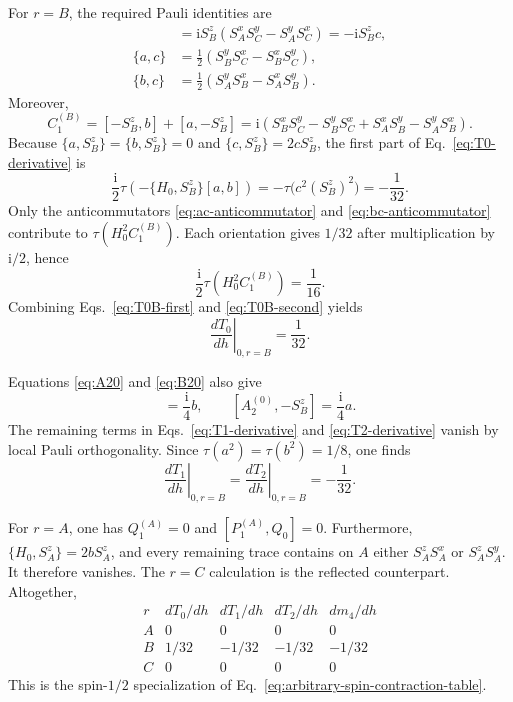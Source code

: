 \documentclass[aps,prb,preprint,nofootinbib,longbibliography]{revtex4-2}
\newcommand{\ii}{\mathrm{i}}
\begin{document}
For $r=B$, the required Pauli identities are
\begin{align}
 [a,b]
 &=\ii S_B^z(S_A^xS_C^y-S_A^yS_C^x)
 =-\ii S_B^zc,
 \label{eq:ab-commutator}\\
 \{a,c\}
 &=\frac12(S_B^yS_C^x-S_B^xS_C^y),
 \label{eq:ac-anticommutator}\\
 \{b,c\}
 &=\frac12(S_A^yS_B^x-S_A^xS_B^y).
 \label{eq:bc-anticommutator}
\end{align}
Moreover,
\begin{equation}
 C_1^{(B)}
 =[-S_B^z,b]+[a,-S_B^z]
 =\ii\left(
 S_B^xS_C^y-S_B^yS_C^x
 +S_A^xS_B^y-S_A^yS_B^x
 \right).
 \label{eq:C1B}
\end{equation}
Because $\{a,S_B^z\}=\{b,S_B^z\}=0$ and
$\{c,S_B^z\}=2cS_B^z$, the first part of
Eq.~\eqref{eq:T0-derivative} is
\begin{equation}
 \frac{\ii}{2}\tau\left(-\{H_0,S_B^z\}[a,b]\right)
 =-\tau\bigl(c^2(S_B^z)^2\bigr)
 =-\frac1{32}.
 \label{eq:T0B-first}
\end{equation}
Only the anticommutators \eqref{eq:ac-anticommutator} and
\eqref{eq:bc-anticommutator} contribute to
$\tau(H_0^2C_1^{(B)})$.  Each orientation gives $1/32$ after multiplication
by $\ii/2$, hence
\begin{equation}
 \frac{\ii}{2}\tau(H_0^2C_1^{(B)})=\frac1{16}.
 \label{eq:T0B-second}
\end{equation}
Combining Eqs.~\eqref{eq:T0B-first} and \eqref{eq:T0B-second} yields
\begin{equation}
 \left.\frac{dT_0}{dh}\right|_{0,r=B}=\frac1{32}.
 \label{eq:T0B-total}
\end{equation}

Equations \eqref{eq:A20} and \eqref{eq:B20} also give
\begin{equation}
 [-S_B^z,B_2^{(0)}]=\frac{\ii}{4}b,
 \qquad
 [A_2^{(0)},-S_B^z]=\frac{\ii}{4}a.
 \label{eq:A2B2-B-commutators}
\end{equation}
The remaining terms in Eqs.~\eqref{eq:T1-derivative} and
\eqref{eq:T2-derivative} vanish by local Pauli orthogonality.  Since
$\tau(a^2)=\tau(b^2)=1/8$, one finds
\begin{equation}
 \left.\frac{dT_1}{dh}\right|_{0,r=B}
 =\left.\frac{dT_2}{dh}\right|_{0,r=B}
 =-\frac1{32}.
 \label{eq:T1T2B}
\end{equation}

For $r=A$, one has $Q_1^{(A)}=0$ and
$[P_1^{(A)},Q_0]=0$.  Furthermore,
\(
\{H_0,S_A^z\}=2bS_A^z
\),
and every remaining trace contains on $A$ either $S_A^zS_A^x$ or
$S_A^zS_A^y$.  It therefore vanishes.  The $r=C$ calculation is the reflected
counterpart.  Altogether,
\begin{equation}
\begin{array}{c|ccc|c}
 r&dT_0/dh&dT_1/dh&dT_2/dh&dm_4/dh\\
 \hline
 A&0&0&0&0\\
 B&1/32&-1/32&-1/32&-1/32\\
 C&0&0&0&0
\end{array}
\label{eq:certificate-table}
\end{equation}
This is the spin-$1/2$ specialization of
Eq.~\eqref{eq:arbitrary-spin-contraction-table}.
\end{document}
